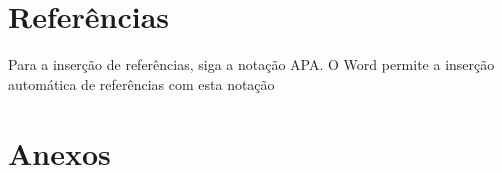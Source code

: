 \documentclass[a4paper,10pt]{report}
\begin{document}
\newpage{}

\section*{Referências}
\pagestyle{fancy}
Para a inserção de referências, siga a notação APA.  O Word permite a inserção automática de referências com  esta notação

\newpage{}
\section*{Anexos}
\end{document}
